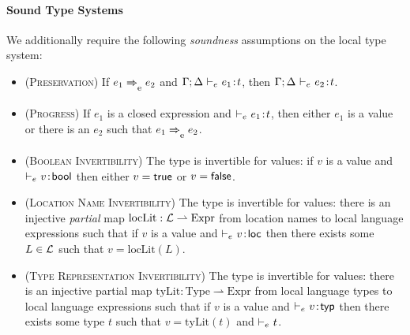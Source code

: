 \paragraph{Sound Type Systems}
\label{sec:sound-type-systems}
We additionally require the following \emph{soundness} assumptions on the local type system:
\begin{itemize}
	\item (\textsc{Preservation}) If $e_1 \localstep{} e_2$ and $\Gamma;\Delta ~{\vdash}_{\footnotesize{e}}~ e_1 \mkern2mu{:}\mkern2mu t$, then $\Gamma;\Delta ~{\vdash}_{\footnotesize{e}}~ e_2 \mkern2mu{:}\mkern2mu t$.

	\item (\textsc{Progress}) If $e_1$ is a closed expression and ${\vdash}_{\footnotesize{e}}~ e_1 \mkern2mu{:}\mkern2mu t$, then either $e_1$ is a value or there is an $e_2$ such that $e_1 \localstep{} e_2$.

	\item (\textsc{Boolean Invertibility}) The type \Bool is invertible for values: if $v$ is a value and ${\vdash}_{\footnotesize{e}}~ v \mkern2mu{:}\mkern2mu \mathsf{bool}$ then either $v = \mathsf{true}$ or $v = \mathsf{false}$.

	\item (\textsc{Location Name Invertibility}) The type \Loc is invertible for values: there is an injective \emph{partial} map $\text{locLit} : \mathcal{L} \rightharpoonup \text{Expr}$ from location names to local language expressions such that if $v$ is a value and ${\vdash}_{\footnotesize{e}}~ v \mkern2mu{:}\mkern2mu \mathsf{loc}$ then there exists some $L \in \mathcal{L}$ such that $v = \text{locLit}(L)$.

	\item (\textsc{Type Representation Invertibility}) The type \Typ is invertible for values: there is an injective partial map $\text{tyLit} : \text{Type} \rightharpoonup \text{Expr}$ from local language types to local language expressions such that if $v$ is a value and ${\vdash}_{\footnotesize{e}}~ v \mkern2mu{:}\mkern2mu \mathsf{typ}$ then there exists some type $t$ such that $v = \text{tyLit}(t)$ and ${\vdash}_{\footnotesize{e}}~ t$.
\end{itemize}

